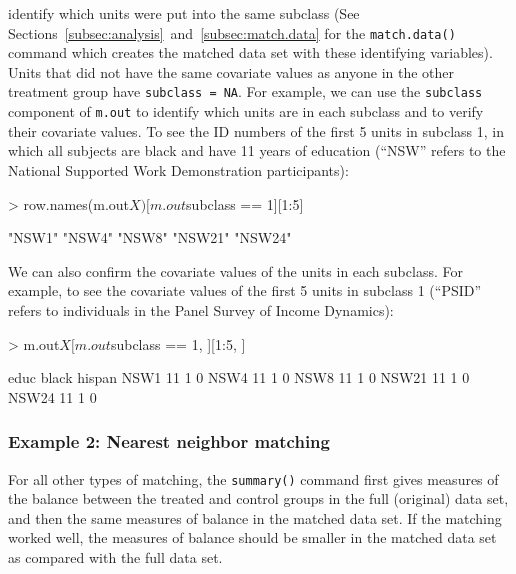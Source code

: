 \documentclass[oneside,letterpaper,titlepage]{article}
\begin{document}
identify which units were put into the same subclass (See
Sections~\ref{subsec:analysis}~and~\ref{subsec:match.data} for the
{\tt match.data()} command which creates the matched data set with
these identifying variables).  Units that did not have the same
covariate values as anyone in the other treatment group have
\texttt{subclass = NA}.  For example, we can use the {\tt subclass}
component of {\tt m.out} to identify which units are in each subclass
and to verify their covariate values.  To see the ID numbers of the
first 5 units in subclass 1, in which all subjects are black and have
11 years of education (``NSW'' refers to the National Supported Work
Demonstration participants):
\begin{Schunk}
\begin{Sinput}
> row.names(m.out$X)[m.out$subclass == 1][1:5]
\end{Sinput}
\begin{Soutput}
[1] "NSW1"  "NSW4"  "NSW8"  "NSW21" "NSW24"
\end{Soutput}
\end{Schunk}
We can also confirm the covariate values of the units in each
subclass.  For example, to see the covariate values of the first 5
units in subclass 1 (``PSID'' refers to individuals in the Panel
Survey of Income Dynamics):
\begin{Schunk}
\begin{Sinput}
> m.out$X[m.out$subclass == 1, ][1:5, ]
\end{Sinput}
\begin{Soutput}
      educ black hispan
NSW1    11     1      0
NSW4    11     1      0
NSW8    11     1      0
NSW21   11     1      0
NSW24   11     1      0
\end{Soutput}
\end{Schunk}

\subsubsection{Example 2: Nearest neighbor matching}
\label{subsubsec:balancenearest}
For all other types of matching, the \texttt{summary()} command
  first gives measures of the balance between the treated and control
  groups in the full (original) data set, and then the same measures
  of balance in the matched data set.  If the matching worked well,
  the measures of balance should be smaller in the matched data set as
  compared with the full data set.
  
\end{document}
